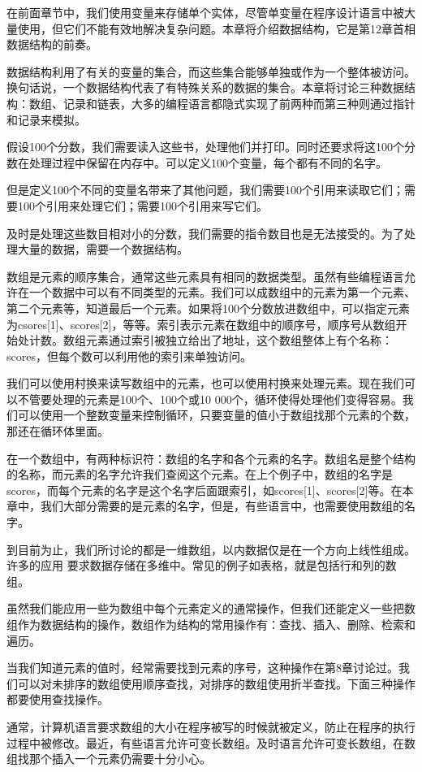 在前面章节中，我们使用变量来存储单个实体，尽管单变量在程序设计语言中被大量使用，但它们不能有效地解决复杂问题。本章将介绍数据结构，它是第12章首相数据结构的前奏。

数据结构利用了有关的变量的集合，而这些集合能够单独或作为一个整体被访问。换句话说，一个数据结构代表了有特殊关系的数据的集合。本章将讨论三种数据结构：数组、记录和链表，大多的编程语言都隐式实现了前两种而第三种则通过指针和记录来模拟。

假设100个分数，我们需要读入这些书，处理他们并打印。同时还要求将这100个分数在处理过程中保留在内存中。可以定义100个变量，每个都有不同的名字。

但是定义100个不同的变量名带来了其他问题，我们需要100个引用来读取它们；需要100个引用来处理它们；需要100个引用来写它们。

及时是处理这些数目相对小的分数，我们需要的指令数目也是无法接受的。为了处理大量的数据，需要一个数据结构。

数组是元素的顺序集合，通常这些元素具有相同的数据类型。虽然有些编程语言允许在一个数据中可以有不同类型的元素。我们可以成数组中的元素为第一个元素、第二个元素等，知道最后一个元素。如果将100个分数放进数组中，可以指定元素为csores[1]、scores[2]，等等。索引表示元素在数组中的顺序号，顺序号从数组开始处计数。数组元素通过索引被独立给出了地址，这个数组整体上有个名称：scores，但每个数可以利用他的索引来单独访问。

我们可以使用村换来读写数组中的元素，也可以使用村换来处理元素。现在我们可以不管要处理的元素是100个、100个或10 000个，循环使得处理他们变得容易。我们可以使用一个整数变量来控制循环，只要变量的值小于数组找那个元素的个数，那还在循环体里面。

在一个数组中，有两种标识符：数组的名字和各个元素的名字。数组名是整个结构的名称，而元素的名字允许我们查阅这个元素。在上个例子中，数组的名字是scores，而每个元素的名字是这个名字后面跟索引，如scores[1]、scores[2]等。在本章中，我们大部分需要的是元素的名字，但是，有些语言中，也需要使用数组的名字。

到目前为止，我们所讨论的都是一维数组，以内数据仅是在一个方向上线性组成。许多的应用 要求数据存储在多维中。常见的例子如表格，就是包括行和列的数组。

虽然我们能应用一些为数组中每个元素定义的通常操作，但我们还能定义一些把数组作为数据结构的操作，数组作为结构的常用操作有：查找、插入、删除、检索和遍历。

当我们知道元素的值时，经常需要找到元素的序号，这种操作在第8章讨论过。我们可以对未排序的数组使用顺序查找，对排序的数组使用折半查找。下面三种操作都要使用查找操作。

通常，计算机语言要求数组的大小在程序被写的时候就被定义，防止在程序的执行过程中被修改。最近，有些语言允许可变长数组。及时语言允许可变长数组，在数组找那个插入一个元素仍需要十分小心。

